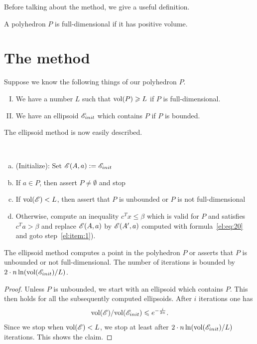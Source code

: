 Before talking about the method, we give a useful definition.

\begin{definition}
   A polyhedron $P$ is full-dimensional if it has positive volume.
\end{definition}

\section{The method}
\label{el:sec:method}



Suppose  we know the following things of our polyhedron $P$. 
\begin{enumerate}[I)]
\item We have a number $L$ such that $\mathrm{vol}(P)\geqslant L$ if $P$ is
  full-dimensional.
\item We have an ellipsoid $\mathscr{E}_{init}$ which contains $P$ if $P$ is
  bounded.
\end{enumerate}
The ellipsoid method is now easily described.


\begin{algorithm}
\label{el:alg:3}
~

\begin{enumerate}[a)]
\item (Initialize): Set $\mathscr{E}(A,a) := \mathscr{E}_{init}$ \label{el:item:2}
\item If $a \in P$, then assert $P \neq \emptyset$ and stop  \label{el:item:1} 
\item If $\mathrm{vol}(\mathscr{E})<L$, then assert that $P$ is unbounded or $P$ is
  not full-dimensional \label{el:item:3}
\item Otherwise, compute an inequality $c^Tx\leq\beta$ which is valid for
  $P$ and satisfies $c^Ta>\beta$ and replace $\mathscr{E}(A,a)$ by $\mathscr{E}(A',a)$
  computed with formula~\eqref{el:eq:20} and goto
  step~\ref{el:item:1}).\label{el:item:4}  
\end{enumerate}
\end{algorithm}
%
\begin{theorem}
  \label{el:thr:21}
  The ellipsoid method computes a point in the polyhedron $P$ or
  asserts that $P$ is unbounded or not full-dimensional. The number of
  iterations is bounded by  $2\cdot n \ln (\mathrm{vol}(\mathscr{E}_{init}) / L)$.
\end{theorem}


\begin{proof}
  Unless $P$ is unbounded, we start with an ellipsoid which contains
  $P$. This then holds for all the subsequently computed
  ellipsoids. After $i$ iterations one has
  \begin{equation}
    \label{el:eq:23}
    \mathrm{vol}(\mathscr{E})/ \mathrm{vol}(\mathscr{E}_{init}) \leqslant e^{-\frac{i}{2n}}.
  \end{equation}
 Since we stop when $\mathrm{vol}(\mathscr{E})<L$, we stop at least after $2\cdot n
 \ln(\mathrm{vol}(\mathscr{E}_{init})/ L)$ iterations. This shows the claim.   
\end{proof}



